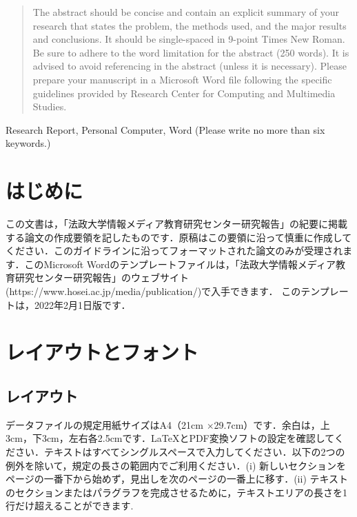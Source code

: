 \documentclass{brccms-hu}
\begin{document}

\begin{abstract}
The abstract should be concise and contain an explicit summary of your research that states the problem, the methods used, and the major results and conclusions. It should be single-spaced in 9-point Times New Roman. Be sure to adhere to the word limitation for the abstract (250 words). It is advised to avoid referencing in the abstract (unless it is necessary). Please prepare your manuscript in a Microsoft Word file following the specific guidelines provided by Research Center for Computing and Multimedia Studies.
\end{abstract}
\begin{keyword}
Research Report, Personal Computer, Word (Please write no more than six keywords.)
\end{keyword}
\maketitle
\section{はじめに}
この文書は，「法政大学情報メディア教育研究センター研究報告」の紀要に掲載する論文の作成要領を記したものです．原稿はこの要領に沿って慎重に作成してください．このガイドラインに沿ってフォーマットされた論文のみが受理されます．このMicrosoft Wordのテンプレートファイルは，「法政大学情報メディア教育研究センター研究報告」のウェブサイト(https://www.hosei.ac.jp/media/publication/)で入手できます．
このテンプレートは，2022年2月1日版です．
\section{レイアウトとフォント}
\subsection{レイアウト}
データファイルの規定用紙サイズはA4（21cm $\times$29.7cm）です．余白は，上3cm，下3cm，左右各2.5cmです．\LaTeX{}とPDF変換ソフトの設定を確認してください．テキストはすべてシングルスペースで入力してください．以下の2つの例外を除いて，規定の長さの範囲内でご利用ください．(i) 新しいセクションをページの一番下から始めず，見出しを次のページの一番上に移す．(ii) テキストのセクションまたはパラグラフを完成させるために，テキストエリアの長さを1行だけ超えることができます.
\end{document}
